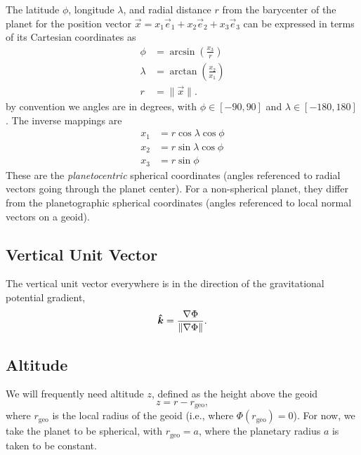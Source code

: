 \documentclass{report}
\begin{document}
The latitude $\phi$, longitude $\lambda$, and radial distance $r$ from the barycenter of the planet for the position vector $\vec{x} = x_1 \vec{e}_1 + x_2 \vec{e}_2 + x_3 \vec{e}_3$ can be expressed in terms of its Cartesian coordinates as
\begin{subequations}
\begin{align}
\phi     &= \arcsin\left(\frac{x_3}{r}\right) \\
\lambda  &= \arctan\left(\frac{x_2}{x_1}\right) \\
r        &= \|\vec{x}\|.
\end{align}
\end{subequations}
by convention we angles are in degrees, with $\phi \in [-90,90]$ and $\lambda \in [-180,180]$. The inverse mappings are
\begin{subequations}
\begin{align}
x_1 &= r \cos \lambda \cos \phi \\
x_2 &= r \sin \lambda \cos \phi \\
x_3 &= r \sin \phi
\end{align}
\end{subequations}
These are the \emph{planetocentric} spherical coordinates (angles referenced to radial vectors going through the planet center). For a non-spherical planet, they differ from the planetographic spherical coordinates (angles referenced to local normal vectors on a geoid).

\subsection{Vertical Unit Vector}

The vertical unit vector everywhere is in the direction of the gravitational potential gradient,
\begin{equation}\label{e:vert_unit_vector}
\boldsymbol{{\hat k}} = \frac{\nabla \Phi}{\|\nabla\Phi\|}.
\end{equation}

\subsection{Altitude}

We will frequently need altitude $z$, defined as the height above the geoid 
\begin{equation}
z=r-r_{\mathrm{geo}}, 
\end{equation}
where  $r_{\mathrm{geo}}$ is the local radius of the geoid (i.e., where $\Phi(r_{\mathrm{geo}})=0$). For now, we take the planet to be spherical, with $r_{\mathrm{geo}} = a$, where the planetary radius $a$ is taken to be constant.
\end{document}
